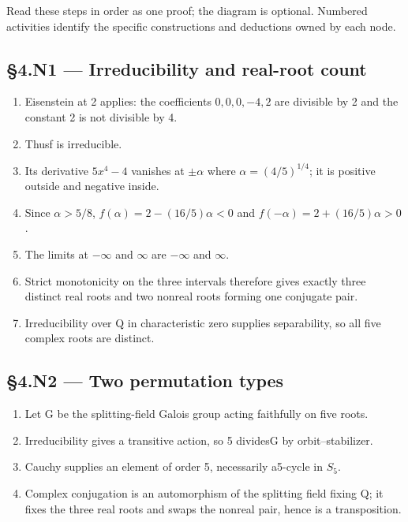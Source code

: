 \documentclass[preprint,12pt,aps,pra,showkeys,amsmath,amssymb,superscriptaddress,floatfix]{revtex4-2}
\theoremstyle{definition}
\theoremstyle{remark}
\begin{document}
Read these steps in order as one proof; the diagram is optional.
Numbered activities identify the specific constructions and deductions
owned by each node.

\subsection{§4.N1 --- Irreducibility and real-root
count}\label{n1-irreducibility-and-real-root-count}

\begin{enumerate}
\def\labelenumi{\arabic{enumi}.}
\item
  Eisenstein at 2 applies: the coefficients \(0,0,0,-4,2\) are divisible
  by 2 and the constant 2 is not divisible by 4.
\item
  Thusf is irreducible.
\item
  Its derivative \(5x^{4}-4\) vanishes at \(\pm \alpha\) where
  \(\alpha =(4/5)^{1/4}\); it is positive outside and negative inside.
\item
  Since \(\alpha >5/8\), \(f(\alpha )=2-(16/5)\alpha <0\) and
  \(f(-\alpha )=2+(16/5)\alpha >0\).
\item
  The limits at \(-\infty\) and \(\infty\) are \(-\infty\) and
  \(\infty\).
\item
  Strict monotonicity on the three intervals therefore gives exactly
  three distinct real roots and two nonreal roots forming one conjugate
  pair.
\item
  Irreducibility over Q in characteristic zero supplies separability, so
  all five complex roots are distinct.
\end{enumerate}

\subsection{§4.N2 --- Two permutation
types}\label{n2-two-permutation-types}

\begin{enumerate}
\def\labelenumi{\arabic{enumi}.}
\item
  Let G be the splitting-field Galois group acting faithfully on five
  roots.
\item
  Irreducibility gives a transitive action, so 5
  divides\textbar G\textbar{} by orbit--stabilizer.
\item
  Cauchy supplies an element of order 5, necessarily a5-cycle in
  \(S_{5}\).
\item
  Complex conjugation is an automorphism of the splitting field fixing
  Q; it fixes the three real roots and swaps the nonreal pair, hence is
  a transposition.
\end{enumerate}
\end{document}
